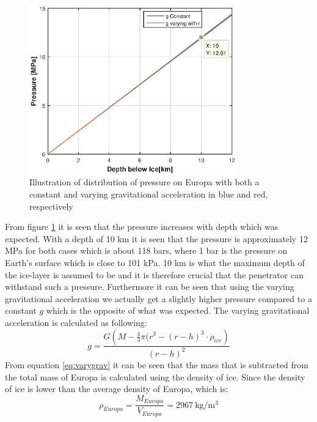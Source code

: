 \begin{figure}[htb]
  \centering
  \includegraphics[width=0.8\textwidth]{figures/Ricardo/pressure.eps}
  \caption{Illustration of distribution of pressure on Europa with both a constant and varying gravitational acceleration in blue and red, respectively}
  \label{fig:Pressure}
\end{figure}
From figure \ref{fig:Pressure} it is seen that the pressure increases with depth which was expected. With a depth of 10 km it is seen that the pressure is approximately 12 MPa for both cases which is about 118 bars, where 1 bar is the pressure on Earth's surface which is close to 101 kPa. 10 km is what the maximum depth of the ice-layer is assumed to be and it is therefore crucial that the penetrator can withstand such a pressure. Furthermore it can be seen that using the varying gravitational acceleration we actually get a slightly higher pressure compared to a constant $g$ which is the opposite of what was expected. The varying gravitational acceleration is calculated as following: 
\begin{equation}\label{eq:varygrav}
g = \frac{G \left(M - \frac{4}{3} \pi (r^3-(r-h)^3 \cdot \rho _{ice}\right)}{(r-h)^2}
\end{equation}
From equation \ref{eq:varygrav} it can be seen that the mass that is subtracted from the total mass of Europa is calculated using the density of ice. Since the density of ice is lower than the average density of Europa, which is:
\begin{equation}
\rho_{Europa} = \frac{M_{Europa}}{V_{Europa}} = \SI{2967}{\kilo\gram\per\cubic\metre}
\end{equation}

